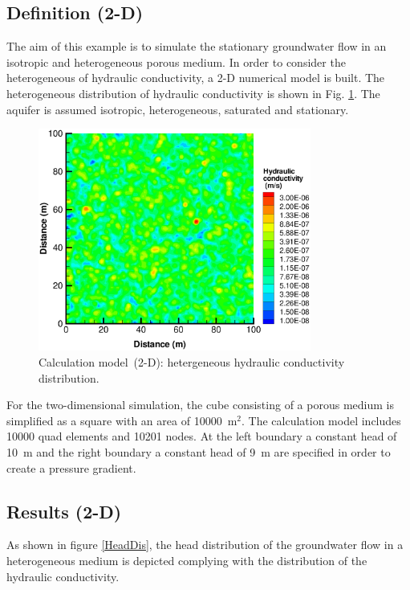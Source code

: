 \subsection{Definition (2-D)}

The aim of this example is to simulate the stationary groundwater flow in an isotropic and heterogeneous porous medium. In order to consider the heterogeneous of hydraulic conductivity, a 2-D numerical model is built. The heterogeneous distribution of hydraulic conductivity is shown in Fig. \ref{KDis}. The aquifer is assumed isotropic, heterogeneous, saturated and stationary.

\begin{figure}[htb]
\centering
\vspace{-10pt}
\includegraphics[width=0.8\textwidth]{Chapter5/figure/KDis.eps}
\vspace{-10pt}
\caption{Calculation model~(2-D): hetergeneous hydraulic conductivity distribution.}
\vspace{-10pt}
\label{KDis}
\end{figure}

For the two-dimensional simulation, the cube consisting of a porous medium is simplified as a square with an area of 10000~m$^2$. The calculation model includes 10000 quad elements and 10201 nodes. At the left boundary  a constant head of 10~m and the right boundary  a constant head of 9~m are specified in order to create a pressure gradient. 

\subsection{Results (2-D)}

As shown in figure \ref{HeadDis}, the head distribution of the groundwater flow in a heterogeneous medium is depicted complying with the distribution of the hydraulic conductivity. 

